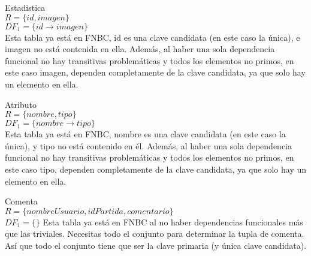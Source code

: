 \item{{\large Estadistica}}\\
$R = \{id, imagen\}$\\
$DF_1 = \{id \rightarrow imagen\}$\\
Esta tabla ya está en FNBC, id es una clave candidata (en este caso la única), e imagen no está contenida en ella. Además, al haber una sola dependencia funcional no hay transitivas problemáticas y todos los elementos no primos, en este caso imagen, dependen completamente de la clave candidata, ya que solo hay un elemento en ella.

\item {{\large Atributo}}\\
$R = \{nombre, tipo\}$\\
$DF_1 = \{nombre \rightarrow tipo\}$\\
Esta tabla ya está en FNBC, nombre es una clave candidata (en este caso la única), y tipo no está contenido en él. Además, al haber una sola dependencia funcional no hay transitivas problemáticas y todos los elementos no primos, en este caso tipo, dependen completamente de la clave candidata, ya que solo hay un elemento en ella.

\item{{\large Comenta}}\\
$R = \{nombreUsuario, idPartida, comentario\}$\\
$DF_1 = \{\}$
Esta tabla ya está en FNBC al no haber dependencias funcionales más que las triviales. Necesitas todo el conjunto para determinar la tupla de comenta. Así que todo el conjunto tiene que ser la clave primaria (y única clave candidata).